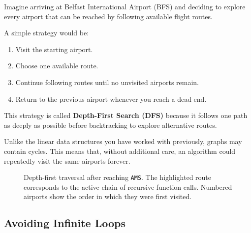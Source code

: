 \documentclass{csc2059practical}
\begin{document}
Imagine arriving at Belfast International Airport (BFS) and deciding to explore every airport that can be reached by following available flight routes.

A simple strategy would be:

\begin{enumerate}
    \item Visit the starting airport.
    \item Choose one available route.
    \item Continue following routes until no unvisited airports remain.
    \item Return to the previous airport whenever you reach a dead end.
\end{enumerate}

This strategy is called \textbf{Depth-First Search (DFS)} because it follows one path as deeply as possible before backtracking to explore alternative routes.

Unlike the linear data structures you have worked with previously, graphs may contain cycles. This means that, without additional care, an algorithm could repeatedly visit the same airports forever.



\begin{figure}[htbp]
    \centering


    \caption{
        Depth-first traversal after reaching \texttt{AMS}.
        The highlighted route corresponds to the active chain of
        recursive function calls. Numbered airports show the order
        in which they were first visited.
    }
    \label{fig:dfs-progress}
\end{figure}

\subsection{Avoiding Infinite Loops}
\end{document}
